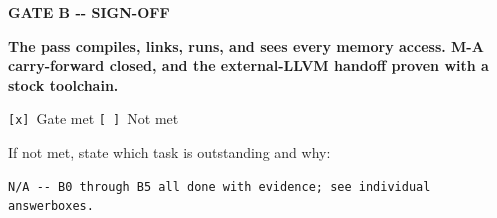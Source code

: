 \documentclass[11pt,a4paper]{article}
\begin{document}
\begin{gatebox}

{\scriptsize\bfseries\color{mute}GATE B -{}- SIGN-OFF}\par\vspace{3pt}

{\bfseries The pass compiles, links, runs, and sees every memory access. M-A carry-forward closed, and the external-LLVM handoff proven with a stock toolchain.}\par\vspace{5pt}

\texttt{[x]}~Gate met \qquad \texttt{[\ ]}~Not met\par\vspace{4pt}

{\scriptsize\color{mute}If not met, state which task is outstanding and why:}

\begin{verbatim}
N/A -- B0 through B5 all done with evidence; see individual answerboxes.
\end{verbatim}

\end{gatebox}
\end{document}

